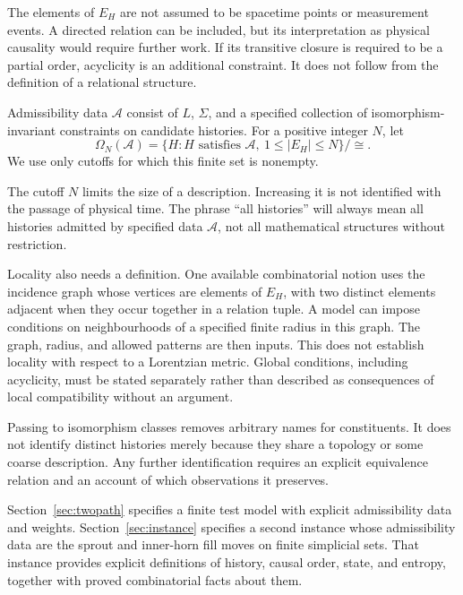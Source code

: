 The elements of $E_H$ are not assumed to be spacetime points or measurement
events. A directed relation can be included, but its interpretation as
physical causality would require further work. If its transitive closure
is required to be a partial order, acyclicity is an additional constraint.
It does not follow from the definition of a relational structure.

\begin{definition}
Admissibility data $\mathcal A$ consist of $L$, $\Sigma$, and a specified
collection of isomorphism-invariant constraints on candidate histories.
For a positive integer $N$, let
\[
  \Omega_N(\mathcal A)
  = \{H : H\text{ satisfies }\mathcal A,\ 1\leq |E_H|\leq N\}/{\cong}.
\]
We use only cutoffs for which this finite set is nonempty.
\end{definition}

The cutoff $N$ limits the size of a description. Increasing it is not
identified with the passage of physical time. The phrase ``all histories''
will always mean all histories admitted by specified data $\mathcal A$,
not all mathematical structures without restriction.

Locality also needs a definition. One available combinatorial notion uses
the incidence graph whose vertices are elements of $E_H$, with two distinct
elements adjacent when they occur together in a relation tuple. A model
can impose conditions on neighbourhoods of a specified finite radius in
this graph. The graph, radius, and allowed patterns are then inputs. This
does not establish locality with respect to a Lorentzian metric. Global
conditions, including acyclicity, must be stated separately rather than
described as consequences of local compatibility without an argument.

Passing to isomorphism classes removes arbitrary names for constituents.
It does not identify distinct histories merely because they share a
topology or some coarse description. Any further identification requires
an explicit equivalence relation and an account of which observations it
preserves.

Section~\ref{sec:twopath} specifies a finite test model with explicit
admissibility data and weights.
Section~\ref{sec:instance} specifies a second instance whose admissibility
data are the sprout and inner-horn fill moves on finite simplicial sets.
That instance provides explicit definitions of history, causal order, state,
and entropy, together with proved combinatorial facts about them.

